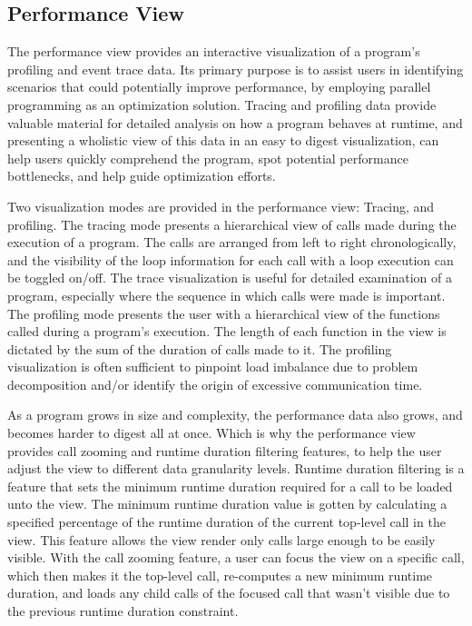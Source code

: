 \documentclass[conference]{IEEEtran}
\begin{document}
\subsection{Performance View}
\label{sec:performance_view}

The performance view provides an interactive visualization of a program's profiling and event trace data. Its primary purpose is to assist users in identifying scenarios that could potentially improve performance, by employing parallel programming as an optimization solution. Tracing and profiling data provide valuable material for detailed analysis on how a program behaves at runtime, and presenting a wholistic view of this data in an easy to digest visualization, can help users quickly comprehend the program, spot potential performance bottlenecks, and help guide optimization efforts.

Two visualization modes are provided in the performance view: Tracing, and profiling. The tracing mode presents a hierarchical view of calls made during the execution of a program. The calls are arranged from left to right chronologically, and the visibility of the loop information for each call with a loop execution can be toggled on/off. The trace visualization is useful for detailed examination of a program, especially where the sequence in which calls were made is important. The profiling mode presents the user with a hierarchical view of the functions called during a program's execution. The length of each function in the view is dictated by the sum of the duration of calls made to it. The profiling visualization is often sufficient to pinpoint load imbalance due to problem decomposition and/or identify the origin of excessive communication time.

As a program grows in size and complexity, the performance data also grows, and becomes harder to digest all at once. Which is why the performance view provides call zooming and runtime duration filtering features, to help the user adjust the view to different data granularity levels. Runtime duration filtering is a feature that sets the minimum runtime duration required for a call to be loaded unto the view. The minimum runtime duration value is gotten by calculating a specified percentage of the runtime duration of the current top-level call in the view. This feature allows the view render only calls large enough to be easily visible. With the call zooming feature, a user can focus the view on a specific call, which then makes it the top-level call, re-computes a new minimum runtime duration, and loads any child calls of the focused call that wasn't visible due to the previous runtime duration constraint.
\end{document}
